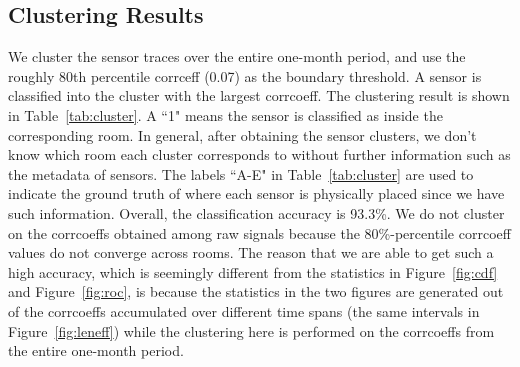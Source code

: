 \subsection{Clustering Results}
We cluster the sensor traces over the entire one-month period, and use the roughly 80th percentile corrceff (0.07) as the boundary threshold. 
A sensor is classified into the cluster with the largest corrcoeff. The clustering result is shown in Table~\ref{tab:cluster}.  A ``1" means the sensor is classified as inside the corresponding room. 
In general, after obtaining the sensor clusters, we don't know which room each cluster corresponds to without further information such as the metadata of sensors. The labels ``A-E" in Table~\ref{tab:cluster} are used to indicate the ground truth of where each sensor is physically placed since we have such information. Overall, the classification accuracy 
is 93.3\%.  We do not cluster on the corrcoeffs obtained among raw signals because the 80\%-percentile corrcoeff values do not converge across rooms.
The reason that we are able to get such a high accuracy, which is seemingly different from the statistics in Figure~\ref{fig:cdf} and Figure~\ref{fig:roc}, is because the statistics in the two figures are generated out of the corrcoeffs accumulated over different time spans (the same intervals in Figure~\ref{fig:leneff}) while the clustering here is performed on the corrcoeffs from the entire one-month period. 


